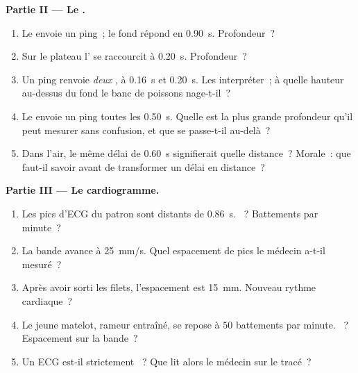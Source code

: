 \begin{problem}[{Problème du week-end --- lire les signaux du monde~:
une loi, $d = v\,t$, localise un orage, cartographie un fond, compte
un battement de cœur et tire au clair comment fonctionne le GPS}]
\medskip
\noindent\textbf{Partie II --- Le .}
\begin{enumerate}[resume]
  \item Le  envoie un ping~; le fond répond en
        \qty{0.90}{s}. Profondeur~?
  \item Sur le plateau l' se raccourcit à
        \qty{0.20}{s}. Profondeur~?
  \item Un ping renvoie \emph{deux} , à
        \qty{0.16}{s} et \qty{0.20}{s}. Les interpréter~; à quelle
        hauteur au-dessus du fond le banc de poissons nage-t-il~?
  \item Le  envoie un ping toutes les \qty{0.50}{s}.
        Quelle est la plus grande profondeur qu'il peut mesurer sans
        confusion, et que se passe-t-il au-delà~?
  \item Dans l'air, le même délai de \qty{0.60}{s} signifierait quelle
        distance~? Morale~: que faut-il savoir avant de transformer un
        délai en distance~?
\end{enumerate}

\medskip
\noindent\textbf{Partie III --- Le cardiogramme.}
\begin{enumerate}[resume]
  \item Les pics d'ECG du patron sont distants de \qty{0.86}{s}.
        ~? Battements par minute~?
  \item La bande avance à \qty{25}{mm/s}. Quel espacement de pics le
        médecin a-t-il mesuré~?
  \item Après avoir sorti les filets, l'espacement est \qty{15}{mm}.
        Nouveau rythme cardiaque~?
  \item Le jeune matelot, rameur entraîné, se repose à $50$ battements
        par minute. ~? Espacement sur la bande~?
  \item Un ECG est-il strictement ~? Que lit
        alors le médecin sur le tracé~?
\end{enumerate}


\end{problem}
